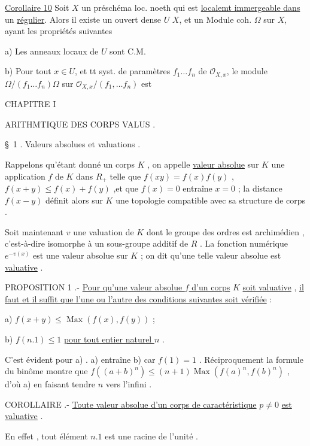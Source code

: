\uline{Corollaire 10} Soit $X$ un préschéma loc. noeth  qui est \uline{localemt immergeable dans} un \uline{régulier}.
Alors il existe un ouvert dense $U$  $X$, et un Module coh. $\Omega$ sur $X$, ayant les propriétés suivantes

a) Les anneaux locaux de $U$ sont C.M.

b) Pour tout $x\in U$, et tt syst. de paramètres $f_1\ldots f_n$ de $\mathcal O_{X,x}$, le module $\Omega/(f_1\ldots f_n)\Omega$ sur $\mathcal O_{X,x}/(f_1,\ldots f_n)$ est

\margin{-}\margin{-}CHAPITRE I

ARITHMTIQUE DES CORPS VALUS .

\S~1 . Valeurs absolues et valuations .

Rappelons qu'étant donné un corps $K$ , on appelle \uline{valeur absolue} sur $K$ une application $f$ de $K$ dans $R_{+}$ telle que $f(xy)=f(x)f(y)$ , $f(x+y)\leqslant f(x)+f(y)$ ,et que $f(x)=0$ entraîne $x=0$ ; la distance $f(x-y)$ définit alors sur $K$ une topologie compatible avec sa structure de corps .

Soit maintenant $v$ une valuation de $K$ dont le groupe des ordres est archimédien , c'est-à-dire isomorphe à un sous-groupe additif de $R$ . La fonction numérique $e^{-v(x)}$ est une valeur absolue sur $K$ ; on dit qu'une telle valeur absolue est \uline{valuative} .

PROPOSITION 1 .- \uline{Pour qu'une valeur absolue $f$ d'un corps} $K$ \uline{soit valuative} , \uline{il faut et il suffit que l'une ou l'autre des conditions suivantes soit vérifiée} :

a) $f(x+y)\leqslant \operatorname{Max}(f(x),f(y))$ ;

b) $f(n.1)\leqslant 1$ \uline{pour tout entier naturel $n$} .

C'est évident pour a) . a) entraîne b) car $f(1)=1$ . Réciproquement la formule du binôme montre que $f((a+b)^n)\leqslant (n+1)\operatorname{Max}(f(a)^n,f(b)^n)$ , d'où a) en faisant tendre $n$ vers l'infini .

COROLLAIRE  .- \uline{Toute valeur absolue d'un corps de caractéristique} $p\neq0$ \uline{est valuative} .

En effet , tout élément $n.1$ est une racine de l'unité .

